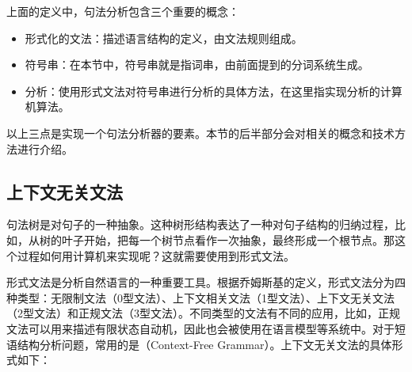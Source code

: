 \parinterval 上面的定义中，句法分析包含三个重要的概念：

\begin{itemize}
\vspace{0.5em}
\item 形式化的文法：描述语言结构的定义，由文法规则组成。
\vspace{0.5em}
\item 符号串：在本节中，符号串就是指词串，由前面提到的分词系统生成。
\vspace{0.5em}
\item 分析：使用形式文法对符号串进行分析的具体方法，在这里指实现分析的计算机算法。
\vspace{0.5em}
\end{itemize}

\parinterval 以上三点是实现一个句法分析器的要素。本节的后半部分会对相关的概念和技术方法进行介绍。
\vspace{-0.5em}


\subsection{上下文无关文法}

\parinterval 句法树是对句子的一种抽象。这种树形结构表达了一种对句子结构的归纳过程，比如，从树的叶子开始，把每一个树节点看作一次抽象，最终形成一个根节点。那这个过程如何用计算机来实现呢？这就需要使用到形式文法。

\parinterval 形式文法是分析自然语言的一种重要工具。根据乔姆斯基的定义\cite{chomsky2002syntactic}，形式文法分为四种类型：无限制文法（0型文法）、上下文相关文法（1型文法）、上下文无关文法（2型文法）和正规文法（3型文法）。不同类型的文法有不同的应用，比如，正规文法可以用来描述有限状态自动机，因此也会被使用在语言模型等系统中。对于短语结构分析问题，常用的是{\small{}}（Context-Free Grammar）。上下文无关文法的具体形式如下：

